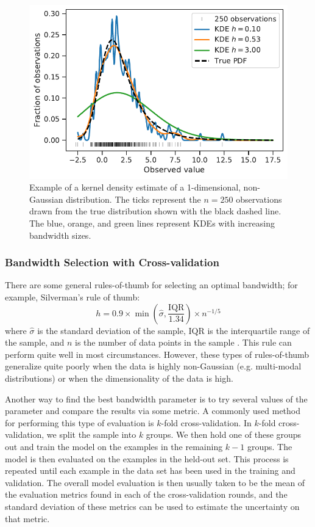 \begin{figure}
    \centering
    \includegraphics{figures/snemo_kde/1d_hist_example.pdf}
    \caption{Example of a kernel density estimate of a 1-dimensional, non-Gaussian distribution. The ticks represent the $n=250$ observations drawn from the true distribution shown with the black dashed line. The blue, orange, and green lines represent KDEs with increasing bandwidth sizes.}
    \label{fig:1d_hist}
\end{figure}

\subsubsection{Bandwidth Selection with Cross-validation}
There are some general rules-of-thumb for selecting an optimal bandwidth; for example, Silverman's rule of thumb:
$$h= 0.9\times\min\left(\hat{\sigma}, \frac{\textrm{IQR}}{1.34}\right) \times n^{-1/5}$$
where $\hat{\sigma}$ is the standard deviation of the sample, $\textrm{IQR}$ is the interquartile range of the sample, and $n$ is the number of data points in the sample \citep{Silverman1986}. This rule can perform quite well in most circumstances. However, these types of rules-of-thumb generalize quite poorly when the data is highly non-Gaussian (e.g. multi-modal distributions) or when the dimensionality of the data is high.

Another way to find the best bandwidth parameter is to try several values of the parameter and compare the results via some metric. A commonly used method for performing this type of evaluation is $k$-fold cross-validation. In $k$-fold cross-validation, we split the sample into $k$ groups. We then hold one of these groups out and train the model on the examples in the remaining $k-1$ groups. The model is then evaluated on the examples in the held-out set. This process is repeated until each example in the data set has been used in the training and validation. The overall model evaluation is then usually taken to be the mean of the evaluation metrics found in each of the cross-validation rounds, and the standard deviation of these metrics can be used to estimate the uncertainty on that metric.

